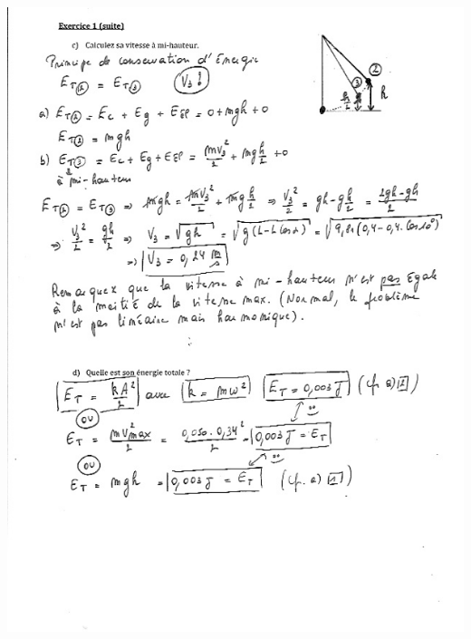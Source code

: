  \includegraphics[width=15cm]{COURS2EnergieOHEXERCRESOL-img/COURS2EnergieOHEXERCRESOL-img009.png} 

